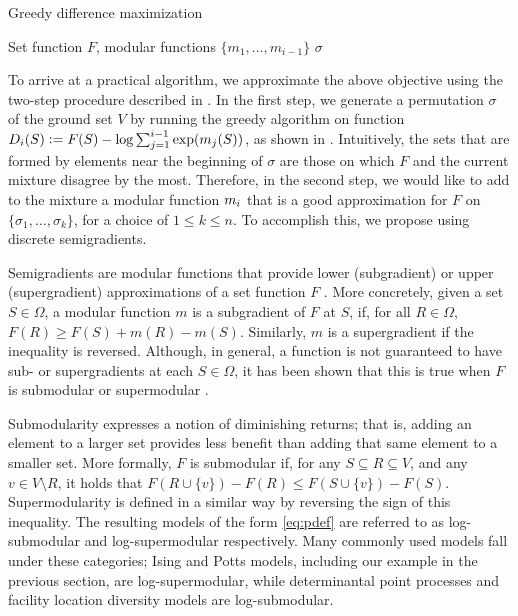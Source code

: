 \begin{algorithm}[tb]
  \caption{Greedy difference maximization}
  \label{alg:greedy}
  \small{
    \begin{algorithmic}[1]
      \REQUIRE Set function $F$, modular functions $\{m_1, \ldots, m_{i-1}\}$
      \ENDFOR
      \RETURN $\sigma$
    \end{algorithmic}
  }
\end{algorithm}

To arrive at a practical algorithm, we approximate the above objective using the two-step procedure described in .
In the first step, we generate a permutation $\sigma$ of the ground set $V$ by running the greedy algorithm on function $D_i(S) \vcentcolon= F(S) - \log \sum_{j=1}^{i-1} \exp(m_j(S))$, as shown in .
Intuitively, the sets that are formed by elements near the beginning of $\sigma$ are those on which $F$ and the current mixture disagree by the most.
Therefore, in the second step, we would like to add to the mixture a modular function $m_i$ that is a good approximation for $F$ on $\{\sigma_1, \ldots, \sigma_k\}$, for a choice of $1 \leq k \leq n$.
To accomplish this, we propose using discrete semigradients.

Semigradients are modular functions that provide lower (subgradient) or upper (supergradient) approximations of a set function $F$ \citep{fujishige05,iyer13}.
More concretely, given a set $S \in \Omega$, a modular function $m$ is a subgradient of $F$ at $S$, if, for all $R \in \Omega$, $F(R) \geq F(S) + m(R) - m(S)$.
Similarly, $m$ is a supergradient if the inequality is reversed.
Although, in general, a function is not guaranteed to have sub- or supergradients at each $S \in \Omega$, it has been shown that this is true when $F$ is submodular or supermodular \citep{fujishige05, jegelka11, iyer12}.

Submodularity expresses a notion of diminishing returns; that is, adding an element to a larger set provides less benefit than adding that same element to a smaller set.
More formally, $F$ is submodular if, for any $S \subseteq R \subseteq V$, and any $v \in V \setminus R$, it holds that $F(R \cup \{v\}) - F(R) \leq F(S \cup \{v\}) - F(S)$.
Supermodularity is defined in a similar way by reversing the sign of this inequality.
The resulting models of the form \eqref{eq:pdef} are referred to as log-submodular and log-supermodular respectively.
Many commonly used models fall under these categories; Ising and Potts models, including our example in the previous section, are log-supermodular, while determinantal point processes and facility location diversity models are log-submodular.

